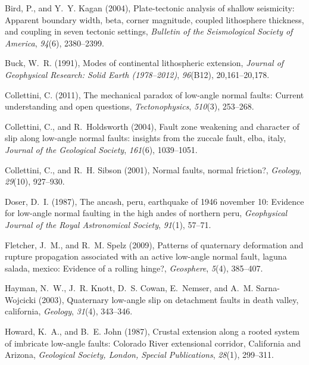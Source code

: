 \documentclass[twocolumn,grl]{AGUTeX}
\begin{document}
\begin{article}
\begin{thebibliography}{23}
Bird, P., and Y.~Y. Kagan (2004), Plate-tectonic analysis of shallow
  seismicity: Apparent boundary width, beta, corner magnitude, coupled
  lithosphere thickness, and coupling in seven tectonic settings,
  \textit{Bulletin of the Seismological Society of America}, \textit{94}(6),
  2380--2399.

Buck, W.~R. (1991), Modes of continental lithospheric extension,
  \textit{Journal of Geophysical Research: Solid Earth (1978--2012)},
  \textit{96}(B12), 20,161--20,178.

Collettini, C. (2011), The mechanical paradox of low-angle normal faults:
  Current understanding and open questions, \textit{Tectonophysics},
  \textit{510}(3), 253--268.

Collettini, C., and R.~Holdsworth (2004), Fault zone weakening and character of
  slip along low-angle normal faults: insights from the zuccale fault, elba,
  italy, \textit{Journal of the Geological Society}, \textit{161}(6),
  1039--1051.

Collettini, C., and R.~H. Sibson (2001), Normal faults, normal friction?,
  \textit{Geology}, \textit{29}(10), 927--930.

Doser, D.~I. (1987), The ancash, peru, earthquake of 1946 november 10: Evidence
  for low-angle normal faulting in the high andes of northern peru,
  \textit{Geophysical Journal of the Royal Astronomical Society},
  \textit{91}(1), 57--71.

Fletcher, J.~M., and R.~M. Spelz (2009), Patterns of quaternary deformation and
  rupture propagation associated with an active low-angle normal fault, laguna
  salada, mexico: Evidence of a rolling hinge?, \textit{Geosphere},
  \textit{5}(4), 385--407.

Hayman, N.~W., J.~R. Knott, D.~S. Cowan, E.~Nemser, and A.~M. Sarna-Wojcicki
  (2003), Quaternary low-angle slip on detachment faults in death valley,
  california, \textit{Geology}, \textit{31}(4), 343--346.

Howard, K.~A., and B.~E. John (1987), Crustal extension along a rooted system
  of imbricate low-angle faults: {Colorado River} extensional corridor,
  {California} and {Arizona}, \textit{Geological Society, London, Special
  Publications}, \textit{28}(1), 299--311.


\end{thebibliography}
\end{article}
\end{document}
